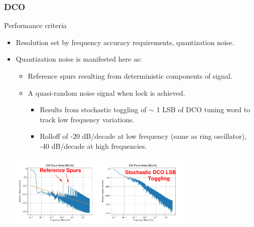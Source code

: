\documentclass[t, screen, aspectratio=43]{beamer}
\begin{document}
\begin{frame}
	\frametitle{DCO}
	\begin{block}{Performance criteria}
		\vspace{-.2em}
		\begin{itemize}
			\scriptsize
			\item Resolution set by frequency accuracy requirements, quantization noise.
			\item Quantization noise is manifested here as:
			\begin{itemize}
				\scriptsize			
				\item Reference spurs resulting from deterministic components of signal.
				\item A quasi-random noise signal when lock is achieved.
				\begin{itemize}
					\scriptsize			
					\item Results from stochastic toggling of $\sim$ 1 LSB of DCO tuning word to track low frequency variations.
					\item Rolloff of -20 dB/decade at low frequency (same as ring oscillator), -40 dB/decade at high frequencies.
				\end{itemize} 				
			\end{itemize} 
		\vspace{-1em}
		\center\includegraphics[width=0.7\textwidth, angle=0]{quant_noise.pdf}
		\vspace{-0.5em}  
		\end{itemize}    
	\end{block}
\end{frame}
\end{document}
